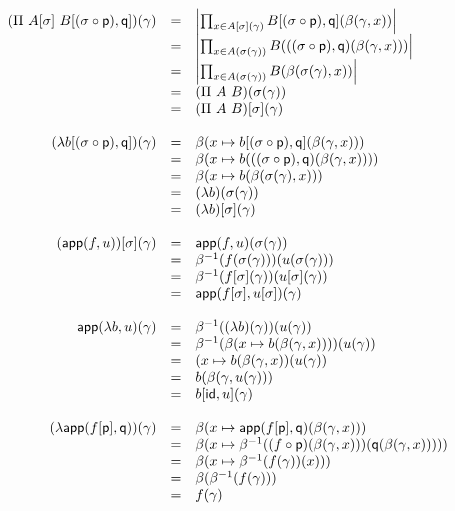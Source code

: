 \[
  \begin{array}{rcl}
    (\Pi\ A[\sigma]\ B[(\sigma \circ \mathsf{p}), \mathsf{q}])(\gamma)
    &=& \left|
      \prod_{x \in A[\sigma](\gamma)}
      B[(\sigma \circ \mathsf{p}), \mathsf{q}](\beta(\gamma, x))
    \right| \\
    &=& \left|
      \prod_{x \in A(\sigma(\gamma))}
      B(((\sigma \circ \mathsf{p}), \mathsf{q})(\beta(\gamma, x)))
    \right| \\
    &=& \left|\prod_{x \in A(\sigma(\gamma))} B(\beta(\sigma(\gamma),x))\right| \\
    &=& (\Pi\ A\ B)(\sigma(\gamma)) \\
    &=& (\Pi\ A\ B)[\sigma](\gamma) \\
    \\
    (\lambda b[(\sigma \circ \mathsf{p}), \mathsf{q}])(\gamma)
    &=& \beta(x \mapsto b[(\sigma \circ \mathsf{p}), \mathsf{q}](\beta(\gamma,x))) \\
    &=& \beta(x \mapsto b(((\sigma \circ \mathsf{p}), \mathsf{q})(\beta(\gamma,x)))) \\
    &=& \beta(x \mapsto b(\beta(\sigma(\gamma), x))) \\
    &=& (\lambda b)(\sigma(\gamma)) \\
    &=& (\lambda b)[\sigma](\gamma) \\
    \\
    (\mathsf{app}(f,u))[\sigma](\gamma)
    &=& \mathsf{app}(f,u)(\sigma(\gamma)) \\
    &=& \beta^{-1}(f(\sigma(\gamma)))(u(\sigma(\gamma))) \\
    &=& \beta^{-1}(f[\sigma](\gamma))(u[\sigma](\gamma)) \\
    &=& \mathsf{app}(f[\sigma], u[\sigma])(\gamma) \\
    \\
    \mathsf{app}(\lambda b, u)(\gamma)
    &=& \beta^{-1}((\lambda b)(\gamma))(u(\gamma)) \\
    &=& \beta^{-1}(\beta(x \mapsto b(\beta(\gamma,x))))(u(\gamma)) \\
    &=& (x \mapsto b(\beta(\gamma,x))(u(\gamma)) \\
    &=& b(\beta(\gamma, u(\gamma))) \\
    &=& b[\mathsf{id}, u](\gamma) \\
    \\
    (\lambda \mathsf{app}(f[\mathsf{p}], \mathsf{q}))(\gamma)
    &=& \beta(x \mapsto \mathsf{app}(f[\mathsf{p}], \mathsf{q})(\beta(\gamma,x))) \\
    &=& \beta(x \mapsto \beta^{-1}((f \circ \mathsf{p})(\beta(\gamma,x)))(\mathsf{q}(\beta(\gamma,x))))) \\
    &=& \beta(x \mapsto \beta^{-1}(f(\gamma))(x))) \\
    &=& \beta(\beta^{-1}(f(\gamma))) \\
    &=& f(\gamma)
  \end{array}
\]
